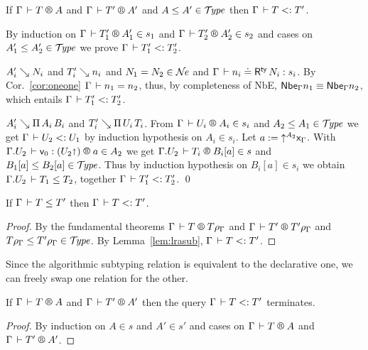 \documentclass[acmlarge,review,anonymous]{acmart}\settopmatter{printfolios=true}
\makeatletter
\newenvironment{proof*}[1][\proofname]{\par
  \normalfont \topsep6\p@\@plus6\p@\relax
  \trivlist
  \item[\@proofindent\hskip\labelsep
        {\@proofnamefont #1\@addpunct{.}}]\ignorespaces
}{%
  \endtrivlist\@endpefalse
}
\makeatother
\begin{document}
\begin{lemma}
\label{lem:lrasub}
\bla
   If\/ $\RG \Gamma T A$ and $\RG \Gamma {T'} {A'}$ and $A \leq A' \in \mathcal{T}\!\mathit{ype}$ then $\Gamma \,\vdash T \mathrel{{<}{:}} T'$.
\end{lemma}
\begin{proof*}
By induction on %
$\LRTS \Gamma {T_1'} {A_1'} {s_1}$ and $\LRTS \Gamma {T_2'} {A_2'} {s_2}$
and cases on $A_1' \leq A_2' \in \mathcal{T}\!\mathit{ype}$
we prove $\Gamma \,\vdash T_1' \mathrel{{<}{:}} T_2'$.

\begin{caselist}

\nextcase $A_i' \searrow N_i$ and $T_i' \searrow n_i$ and $N_1 = N_2 \in \mathcal{N}\!\mathit{e}$ and $\Gamma \,\vdash n_i \doteq \mathsf{R}^{\mathsf{ty}}\, N_i : s_i$.
By Cor.~\ref{cor:oneone} $\Gamma \,\vdash n_1 = n_2$, thus, by completeness of NbE, $\mathsf{Nbe}_{\Gamma} n_1 \equiv \mathsf{Nbe}_{\Gamma} n_2$, which entails $\Gamma \,\vdash T_1' \mathrel{{<}{:}} T_2'$.

\nextcase $A_i' \searrow \Pi\,A_i\, {B_i}$ and  $T_i' \searrow \Pi\,U_i\,{T_i}$.
From $\LRTS \Gamma {U_i} {A_i} {s_i}$ and $A_2 \leq A_1 \in \mathcal{T}\!\mathit{ype}$ we get $\Gamma \,\vdash U_2 \mathrel{{<}{:}} U_1$
by induction hypothesis on $A_i \in s_i$.
Let $a := {\mathord{\uparrow^{A_2}} \mathsf{x}_{\Gamma}}$.  With $\LR {\cext \Gamma {U_2}} {\ind 0} {(U_2\slift)} a {A_2}$ we get
$\LRTS {\cext \Gamma {U_2}} {T_i} {B_i[a]} s$ and $B_1[a] \leq B_2[a] \in \mathcal{T}\!\mathit{ype}$.  Thus by induction hypothesis on $B_i[a] \in s_i$ we obtain $\Gamma. {U_2} \,\vdash T_1 \leq T_2$, together $\Gamma \,\vdash T_1' \mathrel{{<}{:}} T_2'$.
\qed
\end{caselist}
\end{proof*}

\begin{corollary}
\label{cor:complasub}
If\/ $\Gamma \,\vdash T \leq T'$ then $\Gamma \,\vdash T \mathrel{{<}{:}} T'$.
\end{corollary}
\begin{proof}
  By the fundamental theorems $\RG \Gamma T {T\rhog}$ and $\RG \Gamma {T'} {T'\rhog}$ and $T\rho_\Gamma \leq T'\rho_\Gamma \in \mathcal{T}\!\mathit{ype}$.
  By Lemma~\ref{lem:lrasub}, $\Gamma \,\vdash T \mathrel{{<}{:}} T'$.
\end{proof}

Since the algorithmic subtyping relation is equivalent to the declarative one, we can freely swap one relation for the other.

\begin{lemma}
  \label{lem:termasub}
  If\/ $\RG \Gamma T A$ and $\RG \Gamma {T'} {A'}$ then the query $\Gamma \,\vdash T \mathrel{{<}{:}} T'$ terminates.
\end{lemma}
\begin{proof}
  By induction on $A \in s$ and $A' \in s'$ and cases on $\RG \Gamma T A$ and $\RG \Gamma {T'} {A'}$.
\end{proof}
\end{document}
